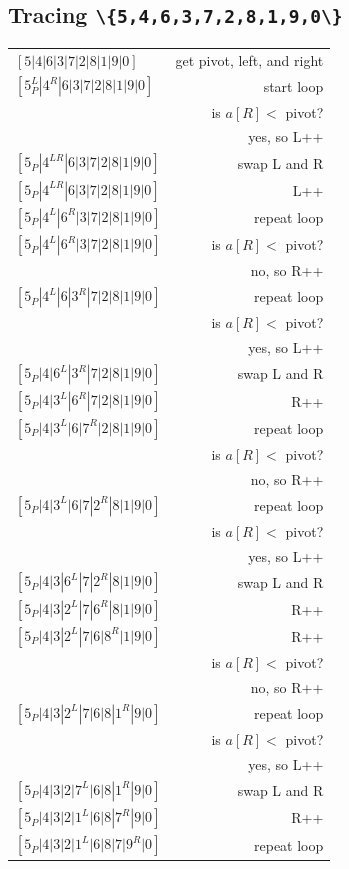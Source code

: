 \documentclass[twoside=false,DIV=14]{scrartcl}
\newcommand{\swaplr}{swap L and R}
\newcommand{\nrpp}{no, so R++}
\newcommand{\ylpp}{yes, so L++}
\newcommand{\isrp}{is $a[R] <$ pivot? }
\begin{document}
\subsection{Tracing \lstinline|\{5,4,6,3,7,2,8,1,9,0\}|}
\begin{tabular}{lr}
    $[5|4|6|3|7|2|8|1|9|0]$ & get pivot, left, and right \\
    $[5_P^L|4^R|6|3|7|2|8|1|9|0]$ & start loop \\
                        & \isrp \\
                        & \ylpp \\
    $[5_P|4^{LR}|6|3|7|2|8|1|9|0]$   & \swaplr \\
    $[5_P|4^{LR}|6|3|7|2|8|1|9|0]$   & L++ \\
    $[5_P|4^L|6^R|3|7|2|8|1|9|0]$   & repeat loop \\
    $[5_P|4^L|6^R|3|7|2|8|1|9|0]$   & \isrp \\
                                    & \nrpp \\
    $[5_P|4^L|6|3^R|7|2|8|1|9|0]$   & repeat loop \\
    & \isrp \\
    & \ylpp \\
    $[5_P|4|6^L|3^R|7|2|8|1|9|0]$   & \swaplr \\
    $[5_P|4|3^L|6^R|7|2|8|1|9|0]$   & R++ \\
    $[5_P|4|3^L|6|7^R|2|8|1|9|0]$   & repeat loop \\
       & \isrp \\
       & \nrpp \\
    $[5_P|4|3^L|6|7|2^R|8|1|9|0]$   & repeat loop \\
    & \isrp \\
    & \ylpp \\
    $[5_P|4|3|6^L|7|2^R|8|1|9|0]$   & \swaplr \\
    $[5_P|4|3|2^L|7|6^R|8|1|9|0]$   & R++ \\
    $[5_P|4|3|2^L|7|6|8^R|1|9|0]$   & R++ \\
    & \isrp \\
    & \nrpp \\
    $[5_P|4|3|2^L|7|6|8|1^R|9|0]$   & repeat loop \\
    & \isrp \\
    & \ylpp \\
    $[5_P|4|3|2|7^L|6|8|1^R|9|0]$   & \swaplr \\
    $[5_P|4|3|2|1^L|6|8|7^R|9|0]$   & R++ \\
    $[5_P|4|3|2|1^L|6|8|7|9^R|0]$   & repeat loop \\

\end{tabular}
\end{document}
